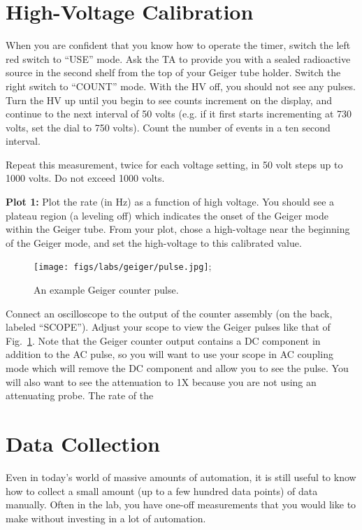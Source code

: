 \section{High-Voltage Calibration}

When you are confident that you know how to operate the timer, switch
the left red switch to ``USE'' mode.  Ask the TA to provide you with a
sealed radioactive source in the second shelf from the top of your
Geiger tube holder.  Switch the right switch to ``COUNT'' mode.  With
the HV off, you should not see any pulses.  Turn the HV up until you
begin to see counts increment on the display, and continue to the next
interval of 50 volts (e.g. if it first starts incrementing at 730
volts, set the dial to 750 volts).  Count the number of events in a
ten second interval.

Repeat this measurement, twice for each voltage setting, in 50 volt
steps up to 1000 volts.  Do not exceed 1000 volts.

{\bf Plot 1: } Plot the rate (in Hz) as a function of high voltage.
You should see a plateau region (a leveling off) which indicates the
onset of the Geiger mode within the Geiger tube.  From your plot,
chose a high-voltage near the beginning of the Geiger mode, and set
the high-voltage to this calibrated value.

\begin{figure}[htbp]
\begin{center}
 \texttt{[image: figs/labs/geiger/pulse.jpg]};
\caption{\label{fig:geigerpulse} An example Geiger counter pulse.}
\end{center}
\end{figure}

Connect an oscilloscope to the output of the counter assembly (on the
back, labeled ``SCOPE'').  Adjust your scope to view the Geiger pulses
like that of Fig.~\ref{fig:geigerpulse}.  Note that the Geiger counter
output contains a DC component in addition to the AC pulse, so you
will want to use your scope in AC coupling mode which will remove the
DC component and allow you to see the pulse.  You will also want to
see the attenuation to 1X because you are not using an attenuating
probe.  The rate of the 




\section{Data Collection}

Even in today's world of massive amounts of automation, it is still
useful to know how to collect a small amount (up to a few hundred data
points) of data manually.  Often in the lab, you have one-off
measurements that you would like to make without investing in a lot of
automation.

